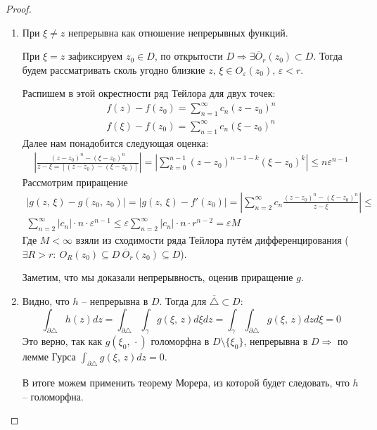 \documentclass[a4paper,12pt]{article}
\renewcommand{\leq}{\ensuremath{\leqslant}}
\theoremstyle{plain}
\theoremstyle{definition}
\theoremstyle{remark}
\begin{document}
\begin{proof}
	\begin{enumerate}
		\item При $\xi \neq z$ непрерывна как отношение непрерывных функций.

		      При $\xi = z$ зафиксируем $z_0 \in D$, по открытости $D \Rightarrow \exists \overline{O}_r(z_0) \subset D$. Тогда будем рассматривать сколь угодно близкие $z,\, \xi \in O_\varepsilon(z_0),\, \varepsilon < r$.

		      Распишем в этой окрестности ряд Тейлора для двух точек:
		      \begin{align*}
			      f(z) - f(z_0) = \sum_{n = 1}^\infty c_n(z - z_0)^n \\
			      f(\xi) - f(z_0) = \sum_{n = 1}^\infty c_n(\xi - z_0)^n
		      \end{align*}
		      Далее нам понадобится следующая оценка:
		      \begin{align*}
			      \left\vert\frac{(z - z_0)^n - (\xi - z_0)^n}{z - \xi = [(z - z_0) - (\xi - z_0)]}\right\vert = \left\vert\sum_{k = 0}^{n - 1}(z - z_0)^{n - 1 - k}(\xi - z_0)^k\right\vert \leq n\varepsilon^{n-1}
		      \end{align*}
		      Рассмотрим приращение
		      \begin{align*}
			      \vert g(z,\, \xi) - g(z_0,\, z_0)\vert = \vert g(z,\, \xi) - f'(z_0)\vert = \left\vert\sum_{n = 2}^\infty c_n \frac{(z - z_0)^n - (\xi - z_0)^n}{z - \xi}\right\vert \leq \\
			      \sum_{n = 2}^\infty \vert c_n\vert\cdot n\cdot\varepsilon^{n - 1} \leq \varepsilon\sum_{n = 2}^\infty \vert c_n\vert\cdot n\cdot r^{n - 2} = \varepsilon M
		      \end{align*}
		      Где $M < \infty$ взяли из сходимости ряда Тейлора путём дифференцирования ($\exists R > r :\: O_R(z_0) \subseteq D \: \overline{O}_r(z_0) \subseteq D$).

		      Заметим, что мы доказали непрерывность, оценив приращение $g$.
		\item Видно, что $h$ -- непрерывна в $D$. Тогда для $\overline{\triangle} \subset D$:
		      \[
			      \int_{\partial\triangle} h(z)dz = \int_{\partial\triangle}\int_\gamma g(\xi,\,z)d\xi dz = \int_\gamma\int_{\partial\triangle}g(\xi,\,z)dzd\xi = 0
		      \]
		      Это верно, так как $g(\xi_0,\, \cdot)$ голоморфна в $D \setminus \{\xi_0\}$, непрерывна в $D \Rightarrow$ по лемме Гурса $\int_{\partial\triangle}g(\xi,\,z)dz = 0$.

		      В итоге можем применить теорему Морера, из которой будет следовать, что $h$ -- голоморфна.
	\end{enumerate}
\end{proof}
\end{document}
